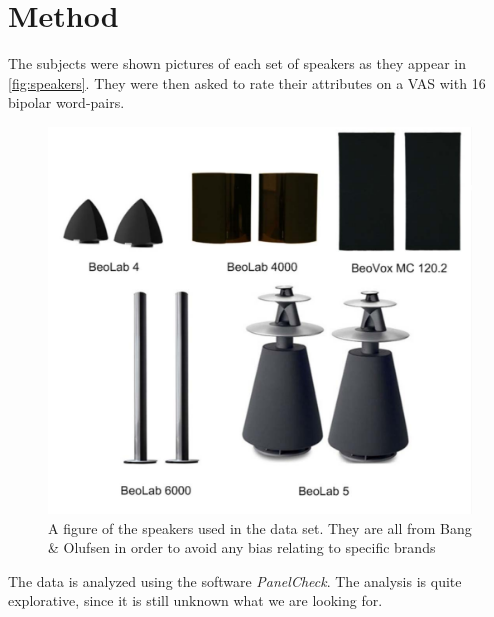 \section*{Method}
\label{Method}
The subjects were shown pictures of each set of speakers as they appear in \autoref{fig:speakers}. They were then asked to rate their attributes on a VAS with 16 bipolar word-pairs. 

\begin{figure}[H]
\centering
\includegraphics[scale = 0.7]{Figure/speakers.png}
\caption{A figure of the speakers used in the data set. They are all from Bang \& Olufsen in order to avoid any bias relating to specific brands}
\label{fig:speakers}
\end{figure}

The data is analyzed using the software \textit{PanelCheck}. The analysis is quite explorative, since it is still unknown what we are looking for. 